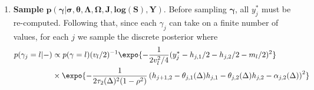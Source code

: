 \begin{enumerate}
\begin{enumerate}
  \item \textbf{Sample} $\boldsymbol{p(J | \Lambda, \Omega, \theta, \mbox{log}(S), \sigma,Y)}.$
    The posterior probability of the indicator function on each jump  is
    \begin{align*}
      \pi_0 := p(N_j(\Delta) = 0 | \boldsymbol{\Lambda}, \boldsymbol{\Omega}, \boldsymbol{\theta}, \boldsymbol{\mbox{log}(S)}, \boldsymbol{\sigma}, \boldsymbol{Y} ) &\propto N\left(\log(S_j) | \mu(\Delta) + \log(S_{j-1}) + \sqrt{\sigma_{j,1}\sigma_{j,2}}\rho\epsilon_{j,2}, \sigma_{j,1}\sigma_{j,2}(1-\rho^2)\right) \cdot \exp(-\lambda \Delta) \\
      \pi_1 := p(N_j(\Delta) > 0 | \boldsymbol{\Lambda}, \boldsymbol{\Omega}, \boldsymbol{\theta}, \boldsymbol{\mbox{log}(S)}, \boldsymbol{\sigma}, \boldsymbol{Y} ) &\propto N\left(\log(S_j) | \mu(\Delta) + \log(S_{j-1}) + \sqrt{\sigma_{j,1}\sigma_{j,2}}\rho\epsilon_{j,2} + \mu_J, \sigma_{j,1}\sigma_{j,2}(1-\rho^2) + \sigma_J^2 \right) \\
      & \quad\quad \cdot (1-\exp(-\lambda \Delta))
    \end{align*}
    Given a non-zero jump at time $j$, the posterior distribution of its size is proportional to a Normal distribution
    \begin{align*}
      p(J_j(\Delta) | \boldsymbol{\Lambda}, \boldsymbol{\Omega}, \boldsymbol{\theta}, \boldsymbol{\mbox{log}(S)}, \boldsymbol{\sigma},\boldsymbol{Y}) \propto N\left(J_j(\Delta) |\log(S_j) - \mu(\Delta) - \log(S_{j-1}) - \sqrt{\sigma_{j,1}\sigma_{j,2}}\rho\epsilon_{j,2}, \sigma_{j,1}\sigma_{j,2}(1-\rho^2) \right)N(J_j(\Delta) | \mu_J, \sigma_J^2) \\
      \propto N\left(J_j(\Delta) \left | \left(\frac{\log(S_j) - \mu(\Delta) - \log(S_{j-1}) - \sqrt{\sigma_{j,1}\sigma_{j,2}}\rho\epsilon_{j,2}}{\sigma_{j,1}\sigma_{j,2}(1-\rho^2)} + \frac{\mu_J}{\sigma^2_J}\right) \cdot \left( \frac{1}{(1-\rho^2)\sigma_{j,1}\sigma_{j,2} } + \frac{1}{\sigma_J^2}   \right)^{-1}, \right.\right. \\
      \left.\left. \left( \frac{1}{(1-\rho^2)\sigma_{j,1}\sigma_{j,2} } + \frac{1}{\sigma_J^2}   \right)^{-1} \right.\right)
    \end{align*}
  \end{enumerate}

\item \textbf{Sample} $\boldsymbol{p(\gamma | \sigma, \theta, \Lambda, \Omega, J, \mbox{log}(S), Y)}.$ Before sampling $\boldsymbol{\gamma}$, all $y^{*}_j$ must be re-computed. Following that, since each $\gamma_j$ can take on a finite number of values, for each $j$ we sample the discrete posterior where
\begin{align*}
  p(\gamma_j = l | - ) &\propto p(\gamma = l) (v_{l} / 2)^{-1} \expo{ -\frac{1}{2 v^2_{l}/4 } ( y^*_j - h_{j,1}/2 - h_{j,2}/2 - m_{l}/2 )^2 } \\
  & \times \expo{ -\frac{1}{2 \tau_2(\Delta)^2 (1-\rho^2) } \left( h_{j+1,2} - \theta_{j,1}(\Delta) h_{j,1} - \theta_{j,2}(\Delta) h_{j,2} - \alpha_{j,2}(\Delta)  \right)^2 }
\end{align*}


\end{enumerate}
